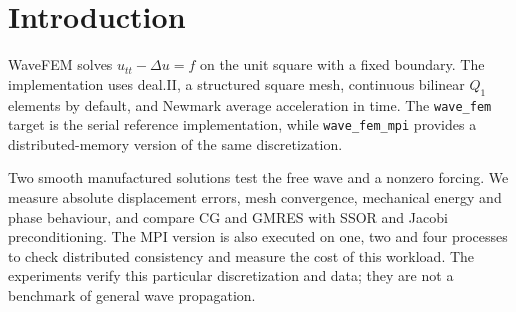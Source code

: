 \chapter{Introduction}

WaveFEM solves \(u_{tt}-\Delta u=f\) on the unit square with a fixed boundary.
The implementation uses deal.II, a structured square mesh, continuous bilinear
\(Q_1\) elements by default, and Newmark average acceleration in time.
The \texttt{wave\_fem} target is the serial reference implementation, while
\texttt{wave\_fem\_mpi} provides a distributed-memory version of the same
discretization.

Two smooth manufactured solutions test the free wave and a nonzero forcing.
We measure absolute displacement errors, mesh convergence, mechanical energy
and phase behaviour, and compare CG and GMRES with SSOR and Jacobi
preconditioning. The MPI version is also executed on one, two and four
processes to check distributed consistency and measure the cost of this
workload. The experiments verify this particular discretization and data;
they are not a benchmark of general wave propagation.
